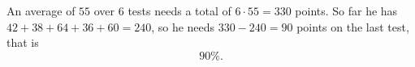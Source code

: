 An average of $55$ over $6$ tests needs a total of $6\cdot55=330$ points. So far he has $42+38+64+36+60=240$, so he needs $330-240=90$ points on the last test, that is
\[\boxed{90\%}.\]
